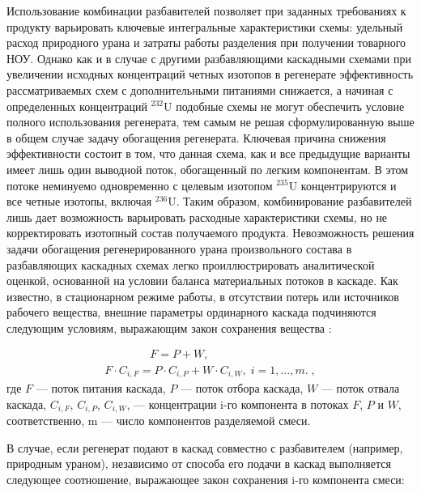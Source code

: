 Использование комбинации разбавителей позволяет при заданных требованиях к продукту варьировать ключевые интегральные характеристики схемы: удельный расход природного урана и затраты работы разделения при получении товарного НОУ. Однако как и в случае с другими разбавляющими каскадными схемами при увеличении исходных концентраций четных изотопов в регенерате эффективность рассматриваемых схем с дополнительными питаниями снижается, а начиная с определенных концентраций $^{232}$U подобные схемы не могут обеспечить условие полного использования регенерата, тем самым не решая сформулированную выше в общем случае задачу обогащения регенерата. Ключевая причина снижения эффективности состоит в том, что данная схема, как и все предыдущие варианты имеет лишь один выводной поток, обогащенный по легким компонентам. В этом потоке неминуемо одновременно с целевым изотопом $^{235}$U концентрируются и все четные изотопы, включая $^{236}$U. Таким образом, комбинирование разбавителей лишь дает возможность варьировать расходные характеристики схемы, но не корректировать изотопный состав получаемого продукта.
Невозможность решения задачи обогащения регенерированного урана произвольного состава в разбавляющих каскадных схемах легко проиллюстрировать аналитической оценкой, основанной на условии баланса материальных потоков в каскаде. 
Как известно, в стационарном режиме работы, в отсутствии потерь или источников рабочего вещества, внешние параметры ординарного каскада подчиняются следующим условиям, выражающим закон сохранения вещества \cite{sulaberidzeTeoriyaKaskadovDlya2011}:
				  
\begin{equation} \label{EQ__1} 
  \begin{array}{l} {\quad \quad \quad \quad F=P+W,} \\ {F \cdot C_{i,F} =P \cdot C_{i,P} +W \cdot C_{i,W} ,\; i=1,...,m. \; ,} \end{array}
\end{equation} 
где $F$ --- поток питания каскада, $P$ --- поток отбора каскада, $W$ --- поток отвала каскада, $C_{i,F}$, $C_{i,P}$, $C_{i,W}$, --- концентрации i-го компонента в потоках $F$, $P$ и $W$, соответственно, m --- число компонентов разделяемой смеси.

В случае, если регенерат подают в каскад совместно с разбавителем (например, природным ураном), независимо от способа его подачи в каскад выполняется следующее соотношение, выражающее закон сохранения i-го компонента смеси:

